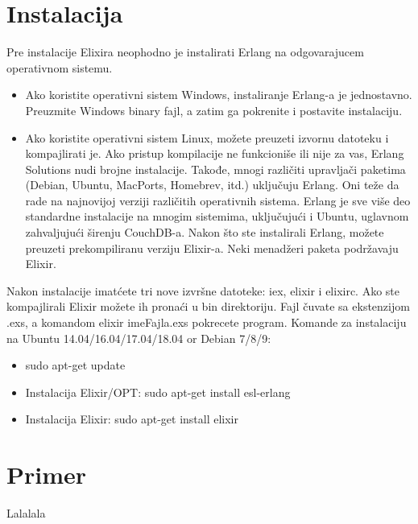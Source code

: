 \documentclass[a4paper]{article}
\begin{document}
\section{Instalacija}
Pre instalacije Elixira neophodno je instalirati Erlang na odgovarajucem operativnom sistemu.
\begin{itemize}
    \item Ako koristite operativni sistem Windows, instaliranje Erlang-a je jednostavno. Preuzmite Windows binary fajl, a zatim ga pokrenite i postavite instalaciju. 
    \item Ako koristite operativni sistem Linux, možete preuzeti izvornu datoteku i kompajlirati je. Ako pristup kompilacije ne funkcioniše ili nije za vas, Erlang Solutions nudi brojne instalacije. Takođe, mnogi različiti upravljači paketima (Debian, Ubuntu, MacPorts, Homebrev, itd.) uključuju Erlang.  Oni teže da rade na najnovijoj verziji različitih operativnih sistema. Erlang je sve više deo standardne instalacije na mnogim sistemima, uključujući i Ubuntu, uglavnom zahvaljujući širenju CouchDB-a. Nakon što ste instalirali Erlang, možete preuzeti prekompiliranu verziju Elixir-a. Neki menadžeri paketa podržavaju Elixir.
\end{itemize}
Nakon instalacije imatćete tri nove izvršne datoteke: iex, elixir i elixirc. Ako ste kompajlirali Elixir možete ih pronaći u bin direktoriju. 
Fajl čuvate sa ekstenzijom .exs, a komandom elixir imeFajla.exs pokrecete program.
Komande za instalaciju na Ubuntu 14.04/16.04/17.04/18.04 or Debian 7/8/9:
\begin{itemize}
    \item sudo apt-get update
    \item Instalacija Elixir/OPT: sudo apt-get install esl-erlang
    \item Instalacija Elixir: sudo apt-get install elixir
\end{itemize}

\section{Primer}
Lalalala
\end{document}
